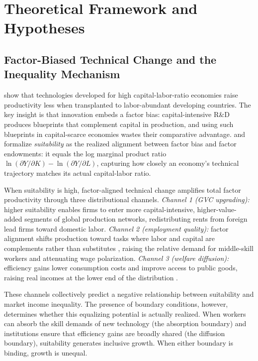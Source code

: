 \documentclass[12pt]{article}
\begin{document}
\section{Theoretical Framework and Hypotheses}
\label{sec:theory}

\subsection{Factor-Biased Technical Change and the Inequality Mechanism}

\citet{acemoglu2001productivity} show that technologies developed for
high capital-labor-ratio economies raise productivity less when
transplanted to labor-abundant developing countries.
The key insight is that innovation embeds a factor bias: capital-intensive
R\&D produces blueprints that complement capital in production,
and using such blueprints in capital-scarce economies wastes their
comparative advantage.
\citet{li2026prosperity} and \citet{li2024suitability} formalize
\emph{suitability} as the realized alignment between factor bias and
factor endowments: it equals the log marginal product ratio
$\ln(\partial Y/\partial K) - \ln(\partial Y/\partial L)$, capturing
how closely an economy's technical trajectory matches its actual
capital-labor ratio.

When suitability is high, factor-aligned technical change amplifies
total factor productivity through three distributional channels.
\emph{Channel 1 (GVC upgrading):} higher suitability enables firms
to enter more capital-intensive, higher-value-added segments of
global production networks, redistributing rents from foreign
lead firms toward domestic labor.
\emph{Channel 2 (employment quality):} factor alignment shifts
production toward tasks where labor and capital are complements
rather than substitutes \citep{autor2003skill}, raising the relative
demand for middle-skill workers and attenuating wage polarization.
\emph{Channel 3 (welfare diffusion):} efficiency gains lower
consumption costs and improve access to public goods, raising real
incomes at the lower end of the distribution
\citep{atkinson2015inequality}.

These channels collectively predict a negative relationship between
suitability and market income inequality.
The presence of boundary conditions, however, determines whether
this equalizing potential is actually realized.
When workers can absorb the skill demands of new technology
(the absorption boundary) and institutions ensure that efficiency
gains are broadly shared (the diffusion boundary), suitability
generates inclusive growth.
When either boundary is binding, growth is unequal.
\end{document}
